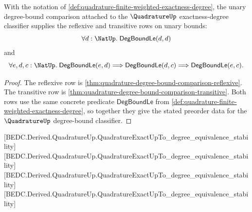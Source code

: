 \begin{proposition}
\label{prop:quadrature-degree-bound-comparison-preorder-rows}
With the notation of \autoref{def:quadrature-finite-weighted-exactness-degree}, the unary degree-bound comparison attached to the $\QuadratureUp$ exactness-degree classifier supplies the reflexive and transitive rows on unary bounds:
$$
\forall d:\NatUp.\;\mathsf{DegBoundLe}(d,d)
$$
and
$$
\forall e,d,c:\NatUp.\;
\mathsf{DegBoundLe}(e,d)\Longrightarrow
\mathsf{DegBoundLe}(d,c)\Longrightarrow
\mathsf{DegBoundLe}(e,c).
$$
\end{proposition}
\begin{proof}
The reflexive row is \autoref{thm:quadrature-degree-bound-comparison-reflexive}. The transitive row is \autoref{thm:quadrature-degree-bound-comparison-transitive}. Both rows use the same concrete predicate $\mathsf{DegBoundLe}$ from \autoref{def:quadrature-finite-weighted-exactness-degree}, so together they give the stated preorder data for the $\QuadratureUp$ degree-bound classifier.
\end{proof}

[BEDC.Derived.QuadratureUp.QuadratureExactUpTo\_degree\_equivalence\_stability]
[BEDC.Derived.QuadratureUp.QuadratureExactUpTo\_degree\_equivalence\_stability]
[BEDC.Derived.QuadratureUp.QuadratureExactUpTo\_degree\_equivalence\_stability]
[BEDC.Derived.QuadratureUp.QuadratureExactUpTo\_degree\_equivalence\_stability]

